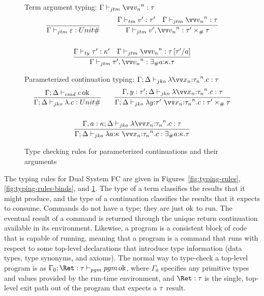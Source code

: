 \documentclass{article}
\begin{document}
\begin{figure}
\centering

 Term argument typing: $\typejmptm{\Gamma}{\vect[n]{\tm_n}}{\ty}$
\begin{gather*}
  \axiom{\typejmptm{\Gamma}{\mt}{\unitjmpty}}
  \qquad
  \infer
  {\typejmptm{\Gamma}{v', \vect[n]{\tm_n}}{\prodjmpty{\ty'}{\ty}}}
  {
    \typetm{\Gamma}{v'}{\ty'}
    &
    \typejmptm{\Gamma}{\vect[n]{\tm_n}}{\ty}
  }
  \\\\
  \infer
  {\typejmptm{\Gamma}{\ty', \vect[n]{\tm_n}}{\existjmpty{\ann a \ki}{\ty}}}
  {
    \typety{\Gamma}{\ty'}{\ki'}
    &
    \typejmptm{\Gamma}{\vect[n]{\tm_n}}{\ty\subst{a}{\ty'}}
  }
\end{gather*}

Parameterized continuation typing:
$\typejmpko{\Gamma}{\Delta}{\fnk{\vect[n]{\ann{x_n}{\ty_n}}}\cmd}{\ty}$
\begin{gather*}
  \infer
  {\typejmpko{\Gamma}{\Delta}{\fnk{}\cmd}{\unitjmpty}}
  {\typecmd{\Gamma}{\Delta}{\cmd}}
  \qquad
  \infer
  {
    \typejmpko
    {\Gamma}{\Delta}
    {\fnk{\ann{y}{\ty'}~\vect[n]{\ann{x_n}{\ty_n}}}\cmd}
    {\prodjmpty{\ty'}{\ty}}
  }
  {
    \typejmpko
    {\Gamma, y:\ty'}{\Delta}
    {\fnk{\vect[n]{\ann{x_n}{\ty_n}}}\cmd}
    {\ty}
  }
  \\\\
  \infer
  {
    \typejmpko
    {\Gamma}{\Delta}
    {\fnk{\ann{a}{\ki}~\vect[n]{\ann{x_n}{\ty_n}}}\cmd}
    {\existjmpty{\ann{a}{\ki}}\ty}
  }
  {
    \typejmpko
    {\Gamma, a:\ki}{\Delta}
    {\fnk{\vect[n]{\ann{x_n}{\ty_n}}}\cmd}
    {\ty}
  }
\end{gather*}

\caption{Type checking rules for parameterized continuations and their arguments}
\label{fig:typing-rules-jumps}
\end{figure}

The typing rules for Dual System FC are given in Figures~\ref{fig:typing-rules},
\ref{fig:typing-rules-binds}, and \ref{fig:typing-rules-jumps}.  The type of a
term classifies the results that it might produce, and the type of a
continuation classifies the results that it expects to consume.  Commands do not
have a type; they are just $\operatorname{ok}$ to run.  The eventual result of a command is
returned through the unique return continuation available in its environment.
Likewise, a program is a consistent block of code that is capable of running,
meaning that a program is a command that runs with respect to some top-level
declarations that introduce type information (data types, type synonyms, and
axioms).  The normal way to type-check a top-level program is as
$\typepgm{\Gamma_0}{\ret\tp:\ty}{\pgm}$, where $\Gamma_0$ specifies any
primitive types and values provided by the run-time environment, and
$\ret\tp:\ty$ is the single, top-level exit path out of the program that expects
a $\tau$ result.
\end{document}
